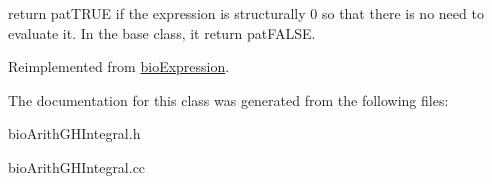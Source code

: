 return pat\+T\+R\+UE if the expression is structurally 0 so that there is no need to evaluate it. In the base class, it return pat\+F\+A\+L\+SE. 

Reimplemented from \hyperlink{classbio_expression_a264c6d78671610ada8261d698e4c4c42}{bio\+Expression}.



The documentation for this class was generated from the following files\+:\begin{DoxyCompactItemize}
\item 
bio\+Arith\+G\+H\+Integral.\+h\item 
bio\+Arith\+G\+H\+Integral.\+cc\end{DoxyCompactItemize}

